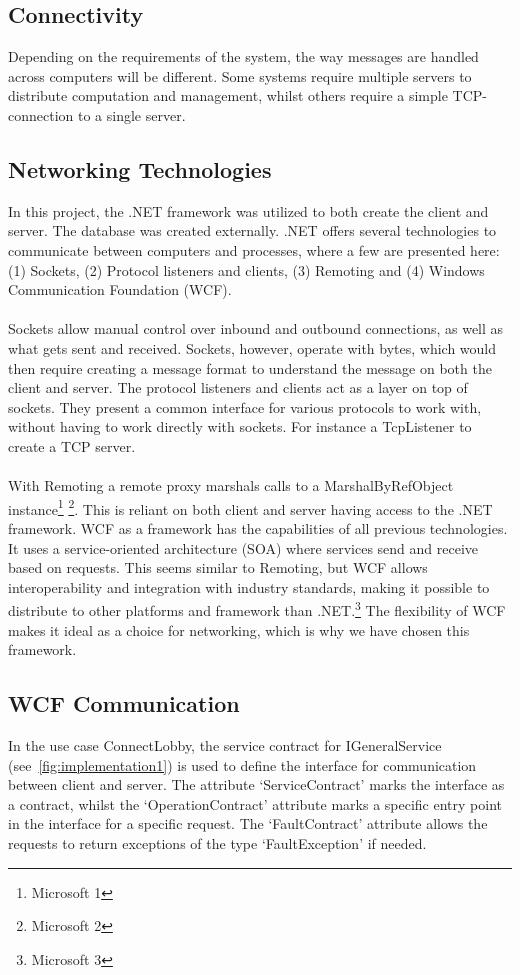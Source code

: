 \subsection {Connectivity}
Depending on the requirements of the system, the way messages are
handled across computers will be different. Some systems require
multiple servers to distribute computation and management, whilst
others require a simple TCP-connection to a single server.

\subsection {Networking Technologies}
In this project, the .NET framework was utilized to both create the
 client and server. The database was created externally. .NET offers
  several technologies to communicate between computers and processes,
   where a few are presented here: (1) Sockets, (2) Protocol listeners
    and clients, (3) Remoting and (4) Windows Communication Foundation (WCF).
\\\\
Sockets allow manual control over inbound and outbound connections, as
 well as what gets sent and received. Sockets, however, operate with bytes,
  which would then require creating a message format to understand the
   message on both the client and server. The protocol listeners and
   clients act as a layer on top of sockets. They present a common interface
    for various protocols to work with, without having to work directly with
    sockets. For instance a TcpListener to create a TCP server.
\\\\
With Remoting a remote proxy marshals calls to a MarshalByRefObject
instance\footnote{Microsoft 1} \footnote{Microsoft 2}. This is reliant
on both client and server having access to the .NET framework. WCF as a
framework has the capabilities of all previous technologies. It uses a
service-oriented architecture (SOA) where services send and receive based
 on requests. This seems similar to Remoting, but WCF allows interoperability
 and integration with industry standards, making it possible to distribute to
  other platforms and framework than .NET.\footnote{Microsoft 3} The
  flexibility of WCF makes it ideal as a choice for networking, which is
  why we have chosen this framework.

\subsection {WCF Communication}
In the use case ConnectLobby, the service contract for
IGeneralService (see~\ref{fig:implementation1}) is used to define the
 interface for communication between client and server. The attribute
 ‘ServiceContract’ marks the interface as a contract, whilst the
  ‘OperationContract’ attribute marks a specific entry point in the interface
  for a specific request. The ‘FaultContract’ attribute allows the requests
   to return exceptions of the type ‘FaultException’ if needed.

